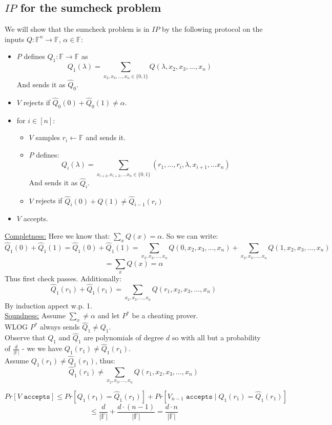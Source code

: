 \subsection*{$IP$ for the sumcheck problem}
We will show that the sumcheck problem is in $IP$ by the following protocol
on the inputs $Q:\mathbb{F}^n\rightarrow\mathbb{F}$, $\alpha\in\mathbb{F}$:
\begin{itemize}
	\item $P$ defines $Q_1:\mathbb{F}\rightarrow \mathbb{F}$ as
	\[
		Q_1(\lambda)=\sum_{x_2,x_3,...,x_n\in\{0,1\}}Q(\lambda,x_2,x_3,...,x_n)
	\]
	And sends it as $\hat{Q}_0$.
	\item $V$ rejects if $\hat{Q}_0(0)+\hat{Q}_0(1)\neq \alpha$.
	\item for $i\in[n]$:
	\begin{itemize}
		\item  $V$ samples $r_i\leftarrow \mathbb{F}$ and sends it.
		\item $P$ defines:
		\[Q_i(\lambda)
		=\sum_{x_{i+2},x_{i+3},...x_n\in\{0,1\}}(r_1,...,r_i,\lambda ,x_{i+1},...x_n)\]
		And sends it as $\hat{Q}_i$.
		\item $V$ rejects if $\hat{Q}_{i}(0)+Q(1)\neq\hat{Q}_{i-1}(r_i)$
	\end{itemize}
	\item $V$ accepts.
\end{itemize}

\underline{Completness:}
Here we know that: $\sum_xQ(x)=\alpha$. So we can write:
\[
	\hat{Q}_1(0)+\hat{Q}_1(1)=\hat{Q}_1(0)+\hat{Q}_1(1)
	=\sum_{x_2,x_3,...,x_n}Q(0,x_2,x_3,...,x_n)+\sum_{x_2,x_3,...,x_n}Q(1,x_2,x_3,...,x_n)
\]\[
	=\sum_xQ(x)=\alpha
\]
Thus first check passes. Additionally:
\[
	\hat{Q}_1(r_1)+\hat{Q}_1(r_1)
	=\sum_{x_2,x_3,...,x_n}Q(r_1,x_2,x_3,...,x_n)
\]
By induction appect w.p. 1.\\

\underline{Soundness:}
Assume $\sum_x\neq\alpha$ and let $P^*$ be a cheating prover.\\
WLOG $P^*$ always sends $\hat{Q}_1\neq Q_1$.\\
Observe that $Q_1$ and $\hat{Q}_1$ are polynomials of degree $d$
so with all but a probability of $\frac{d}{|\mathbb{F}|}$ - we we have $Q_1(r_1)\neq \hat{Q}_1(r_1)$.\\
Assume $Q_1(r_1)\neq \hat{Q}_1(r_1)$, thus:
\[
	\hat{Q}_1(r_1)\neq\sum_{x_2,x_3,...,x_n}Q(r_1,x_2,x_3,...,x_n)	
\]

\[
	Pr[V \texttt{ accepts}]\leq 
	Pr[Q_1(r_1)=\hat{Q}_1(r_1)]
	+Pr[V_{n-1} \texttt{ accepts}\mid Q_1(r_1)=\hat{Q}_1(r_1)]
\]\[
	\leq \frac{d}{|\mathbb{F}|}
	+\frac{d\cdot(n-1)}{|\mathbb{F}|}
	=\frac{d\cdot n}{|\mathbb{F}|}
\]

